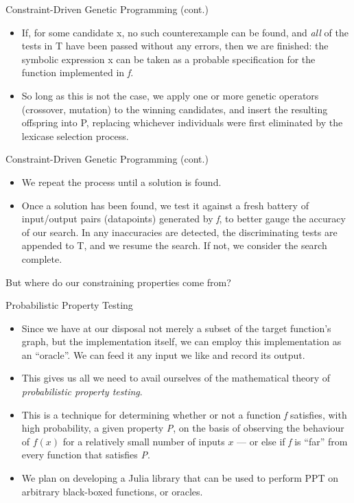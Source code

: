 \documentclass[presentation]{beamer}
\begin{document}
\begin{frame}[label={sec:org130444a}]{Constraint-Driven Genetic Programming (cont.)}
\begin{itemize}
\item If, for some candidate \alert{x}, no such counterexample can be found, and \emph{all} of the tests in \alert{T} have been passed without any errors, then we are finished: the symbolic expression \alert{x} can be taken as a probable specification for the function implemented in \emph{f}.
\item So long as this is not the case, we apply one or more genetic operators (crossover, mutation) to the winning candidates, and insert the resulting offspring into \alert{P}, replacing whichever individuals were first eliminated by the lexicase selection process.
\end{itemize}
\end{frame}

\begin{frame}[label={sec:orgeff130f}]{Constraint-Driven Genetic Programming (cont.)}
\begin{itemize}
\item We repeat the process until a solution is found.
\item Once a solution has been found, we test it against a fresh battery of input/output pairs (datapoints) generated by \emph{f}, to better gauge the accuracy of our search. In any inaccuracies are detected, the discriminating tests are appended to \alert{T}, and we resume the search. If not, we consider the search complete.
\end{itemize}

\begin{block}{But where do our constraining properties come from?}
\end{block}
\end{frame}

\begin{frame}[label={sec:orgf9313d4}]{Probabilistic Property Testing}
\begin{itemize}
\item Since we have at our disposal not merely a subset of the target function's graph, but the implementation itself, we can employ this implementation as an ``oracle''. We can feed it any input we like and record its output.

\item This gives us all we need to avail ourselves of the mathematical theory of \emph{probabilistic property testing}.

\item This is a technique for determining whether or not a function \emph{f} satisfies, with high probability, a given property \emph{P}, on the basis of observing the behaviour of \(f(x)\) for a relatively small number of inputs \(x\) --- or else if \emph{f} is ``far'' from every function that satisfies \emph{P}.

\item We plan on developing a Julia library that can be used to perform PPT on arbitrary black-boxed functions, or oracles.
\end{itemize}
\end{frame}
\end{document}
